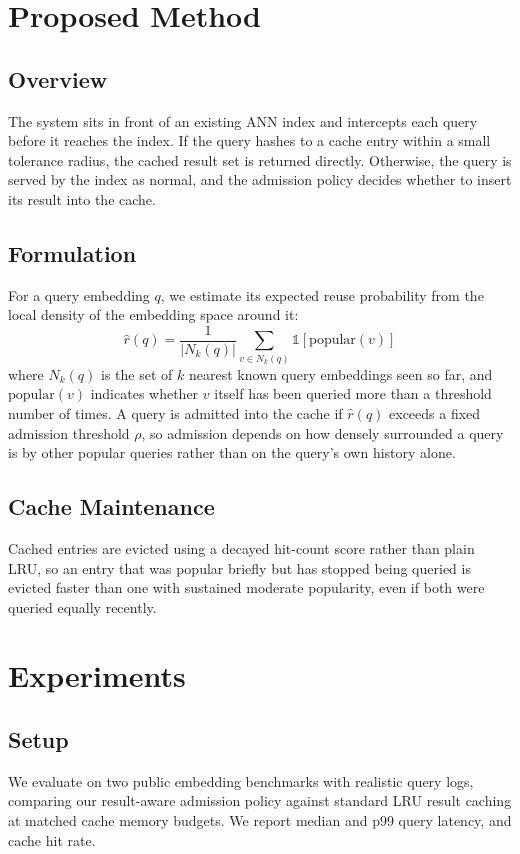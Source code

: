 \documentclass[acmsmall]{acmart}
\begin{document}
\section{Proposed Method}
\subsection{Overview}
The system sits in front of an existing ANN index and intercepts each query before it reaches the index. If the query hashes to a cache entry within a small tolerance radius, the cached result set is returned directly. Otherwise, the query is served by the index as normal, and the admission policy decides whether to insert its result into the cache.

\subsection{Formulation}
For a query embedding $q$, we estimate its expected reuse probability from the local density of the embedding space around it:
\begin{equation}
\hat{r}(q) = \frac{1}{|N_k(q)|}\sum_{v \in N_k(q)} \mathbb{1}[\text{popular}(v)]
\label{eq:reuse}
\end{equation}
where $N_k(q)$ is the set of $k$ nearest known query embeddings seen so far, and $\text{popular}(v)$ indicates whether $v$ itself has been queried more than a threshold number of times. A query is admitted into the cache if $\hat{r}(q)$ exceeds a fixed admission threshold $\rho$, so admission depends on how densely surrounded a query is by other popular queries rather than on the query's own history alone.

\subsection{Cache Maintenance}
Cached entries are evicted using a decayed hit-count score rather than plain LRU, so an entry that was popular briefly but has stopped being queried is evicted faster than one with sustained moderate popularity, even if both were queried equally recently.

\section{Experiments}
\subsection{Setup}
We evaluate on two public embedding benchmarks with realistic query logs, comparing our result-aware admission policy against standard LRU result caching at matched cache memory budgets. We report median and p99 query latency, and cache hit rate.
\end{document}
